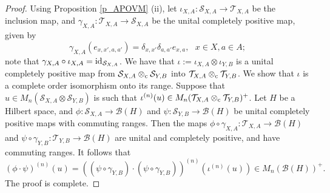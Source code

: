 \documentclass[11pt]{amsart}
\theoremstyle{definition}
\DeclareMathOperator{\id}{id}
\newcommand{\cl}[1]{\mathcal{#1}}
\begin{document}
\begin{proof}
Using Proposition \ref{p_APOVM} (ii), 
let $\iota_{X,A} : \cl S_{X,A}\to \cl T_{X,A}$ be the inclusion map, and 
$\gamma_{X,A} : \cl T_{X,A}\to \cl S_{X,A}$ be the unital completely positive map, 
given by 
$$\gamma_{X,A}(e_{x,x',a,a'}) = \delta_{x,x'} \delta_{a,a'} e_{x,a}, \ \ \ 
x\in X, a\in A;$$
note that 
$\gamma_{X,A}\circ\iota_{X,A} = \id\hspace{-0.05cm}\mbox{}_{\cl S_{X,A}}$.
We have that 
$\iota := \iota_{X,A}\otimes \iota_{Y,B}$ is a unital 
completely positive map from 
$\cl S_{X,A}\otimes_{\rm c} \cl S_{Y,B}$ into 
$\cl T_{X,A}\otimes_{\rm c} \cl T_{Y,B}$. We show that $\iota$ is a complete order isomorphism 
onto its range. Suppose that $u\in M_n(\cl S_{X,A}\otimes \cl S_{Y,B})$
is such that $\iota^{(n)}(u)\in M_n(\cl T_{X,A}\otimes_{\rm c} \cl T_{Y,B})^+$.
Let $H$ be a Hilbert space, and 
$\phi : \cl S_{X,A}\to \cl B(H)$ and $\psi : \cl S_{Y,B}\to \cl B(H)$
be unital completely positive maps with commuting ranges. 
Then the maps $\phi\circ \gamma_{X,A} : \cl T_{X,A}\to \cl B(H)$ and 
$\psi\circ \gamma_{Y,B} : \cl T_{Y,B}\to \cl B(H)$ are unital and completely positive, 
and have commuting ranges. It follows that 
$$
(\phi\cdot\psi)^{(n)}(u) 
= \left((\psi\circ \gamma_{Y,B})\cdot (\psi\circ \gamma_{Y,B})\right)^{(n)}
\left(\iota^{(n)}(u)\right) \in M_n(\cl B(H))^+.
$$
The proof is complete. 
\end{proof}
\end{document}
